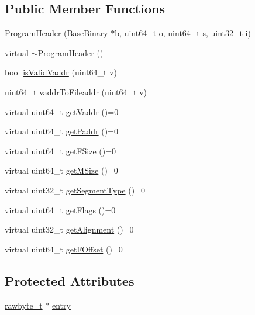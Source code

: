 \subsection*{\-Public \-Member \-Functions}
\begin{DoxyCompactItemize}
\item 
\hyperlink{class_e_p_a_x_1_1_elf_1_1_program_header_a3696fa6a32c99da64d87a686a881fe9a}{\-Program\-Header} (\hyperlink{class_e_p_a_x_1_1_base_binary}{\-Base\-Binary} $\ast$b, uint64\-\_\-t o, uint64\-\_\-t s, uint32\-\_\-t i)
\item 
virtual \hyperlink{class_e_p_a_x_1_1_elf_1_1_program_header_a9da71f94c2c142aafde175151d48937f}{$\sim$\-Program\-Header} ()
\item 
bool \hyperlink{class_e_p_a_x_1_1_elf_1_1_program_header_ae31e5d8dba8226b42315bcfa28b5d596}{is\-Valid\-Vaddr} (uint64\-\_\-t v)
\item 
uint64\-\_\-t \hyperlink{class_e_p_a_x_1_1_elf_1_1_program_header_a42aab9c522155567f18175b1f09d4d3c}{vaddr\-To\-Fileaddr} (uint64\-\_\-t v)
\item 
virtual uint64\-\_\-t \hyperlink{class_e_p_a_x_1_1_elf_1_1_program_header_aa8a7d552ece248bccfda3d320fe2d2ab}{get\-Vaddr} ()=0
\item 
virtual uint64\-\_\-t \hyperlink{class_e_p_a_x_1_1_elf_1_1_program_header_aff0f58569378cdcb6c4d7ab309af62c7}{get\-Paddr} ()=0
\item 
virtual uint64\-\_\-t \hyperlink{class_e_p_a_x_1_1_elf_1_1_program_header_aa0dfb27d2bb6b869c2810c2ee070ff7b}{get\-F\-Size} ()=0
\item 
virtual uint64\-\_\-t \hyperlink{class_e_p_a_x_1_1_elf_1_1_program_header_ab624186a1963231b21722025d9f87a32}{get\-M\-Size} ()=0
\item 
virtual uint32\-\_\-t \hyperlink{class_e_p_a_x_1_1_elf_1_1_program_header_a2034c6e8212ac3ced6719a706b48d6d1}{get\-Segment\-Type} ()=0
\item 
virtual uint64\-\_\-t \hyperlink{class_e_p_a_x_1_1_elf_1_1_program_header_a566bcceecb66e2b159e3e52b44e2f941}{get\-Flags} ()=0
\item 
virtual uint32\-\_\-t \hyperlink{class_e_p_a_x_1_1_elf_1_1_program_header_acfef642e82022bdd883944e48dff4015}{get\-Alignment} ()=0
\item 
virtual uint64\-\_\-t \hyperlink{class_e_p_a_x_1_1_elf_1_1_program_header_a328166b748f2717c9da393210f7aa9cc}{get\-F\-Offset} ()=0
\end{DoxyCompactItemize}
\subsection*{\-Protected \-Attributes}
\begin{DoxyCompactItemize}
\item 
\hyperlink{_e_p_a_x_common_internal_8hpp_a17755bdd71c02e656c667b16de61dd7b}{rawbyte\-\_\-t} $\ast$ \hyperlink{class_e_p_a_x_1_1_elf_1_1_program_header_a25865997e5c358b60ff630a68494c89c}{entry}
\end{DoxyCompactItemize}


